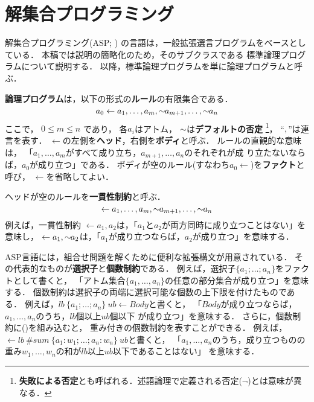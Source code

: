 \chapter{解集合プログラミング}\label{chap:asp}

解集合プログラミング(ASP; \cite{%
  Baral03:cambridge,%
  Gelfond88:iclp,%
  Niemela99:amai,%
  Inoue08:jssst})
の言語は，一般拡張選言プログラムをベースとしている．
本稿では説明の簡略化のため，そのサブクラスである
標準論理プログラムについて説明する．
以降，標準論理プログラムを単に論理プログラムと呼ぶ．

\textbf{論理プログラム}は，以下の形式の\textbf{ルール}の有限集合である．
\begin{equation}
  \label{eq:rule}
  a_0\leftarrow a_1,\dots,a_m,{\sim\!\!{a_{m+1}}},\dots,{\sim\!\!{a_n}}
\end{equation}
ここで，
$0\leq m\leq n$ であり，
各$a_i$はアトム，
${\sim\!\!{}}$は\textbf{デフォルトの否定}
\footnote{\textbf{失敗による否定}とも呼ばれる．述語論理で定義される否定($\neg$)とは意味が異なる．}，
``$,$''は連言を表す．
$\leftarrow$の左側を\textbf{ヘッド}，右側を\textbf{ボディ}と呼ぶ．
ルールの直観的な意味は，
「$a_1,\ldots,a_m$がすべて成り立ち，$a_{m+1},\ldots,a_n$のそれぞれが成
り立たないならば，$a_0$が成り立つ」である．
ボディが空のルール(すなわち\(a_0\leftarrow\))を\textbf{ファクト}と呼び，
$\leftarrow$を省略してよい．

ヘッドが空のルールを\textbf{一貫性制約}と呼ぶ．
\begin{equation}
  \label{eq:constr}
  \leftarrow a_1,\dots,a_m,{\sim\!\!{a_{m+1}}},\dots,{\sim\!\!{a_n}}
\end{equation}
例えば，一貫性制約
\(\leftarrow a_1,a_2\)は，「$a_1$と$a_2$が両方同時に成り立つことはない」を意味し，
\(\leftarrow a_1, {\sim\!\!{a_{2}}}\)は，「$a_1$が成り立つならば，$a_2$が成り立つ」を意味する．

ASP言語には，組合せ問題を解くために便利な拡張構文が用意されている．
その代表的なものが\textbf{選択子}と\textbf{個数制約}である．
例えば，選択子\(\{a_1;\dots;a_n\}\)をファクトとして書くと，
「アトム集合\(\{a_1,\dots,a_n\}\)の任意の部分集合が成り立つ」を意味する．
個数制約は選択子の両端に選択可能な個数の上下限を付けたものである．
例えば，\(lb\ \{a_1;\dots;a_n\}\ ub \leftarrow Body\)と書くと，
「$Body$が成り立つならば，$a_1,\dots,a_n$のうち，$lb$個以上$ub$個以下
が成り立つ」を意味する．
さらに，個数制約に()を組み込むと，
重み付きの個数制約を表すことができる．
例えば，\( \leftarrow lb\ \#sum\ \{a_1:w_1;\dots;a_n:w_n\}\ ub \)と書くと，
「$a_1,\dots,a_n$のうち，成り立つものの
重み$w_1,\dots,w_n$の和が$lb$以上$ub$以下であることはない」
を意味する．

